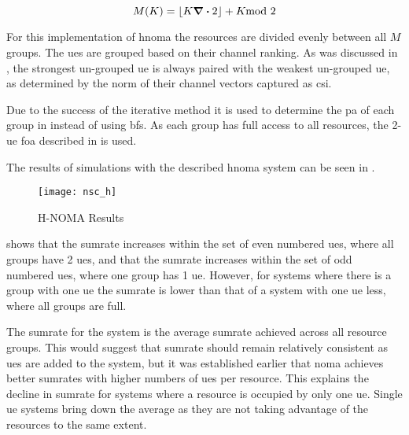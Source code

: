 \begin{equation}
	M(K) = \floor*{K \div 2} + K\hspace{-0.7em}\mod{2}
	\label{eq:group}
\end{equation}

\par
For this implementation of \ac{hnoma} the resources are divided evenly between all $M$ groups.
The \acp{ue} are grouped based on their channel ranking.
As was discussed in , the strongest un-grouped \ac{ue} is always paired with the weakest un-grouped \ac{ue}, as determined by the norm of their channel vectors captured as \ac{csi}.

\par
Due to the success of the iterative method it is used to determine the \ac{pa} of each group in instead of using \ac{bfs}.
As each group has full access to all resources, the 2-\ac{ue} \ac{foa} described in  is used.

\par
The results of simulations with the described \ac{hnoma} system can be seen in .

\begin{figure}[H]
	\centering
	\texttt{[image: nsc\_h]}
	\caption{H-NOMA Results}
	\label{fig:nsc_h}
\end{figure}

\par
{} shows that the sumrate increases within the set of even numbered \acp{ue}, where all groups have 2 \acp{ue}, and that the sumrate increases within the set of odd numbered \acp{ue}, where one group has 1 \ac{ue}.
However, for systems where there is a group with one \ac{ue} the sumrate is lower than that of a system with one \ac{ue} less, where all groups are full.

\par
The sumrate for the system is the average sumrate achieved across all resource groups.
This would suggest that sumrate should remain relatively consistent as \acp{ue} are added to the system, but it was established earlier that \ac{noma} achieves better sumrates with higher numbers of \acp{ue} per resource.
This explains the decline in sumrate for systems where a resource is occupied by only one \ac{ue}.
Single \ac{ue} systems bring down the average as they are not taking advantage of the resources to the same extent.

